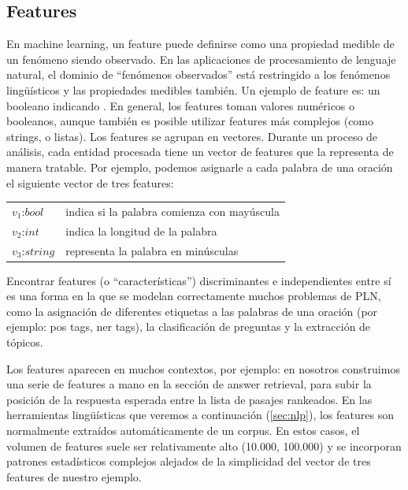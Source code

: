 \subsection*{Features}
\label{subsec:features}

En machine learning, un feature puede definirse como una propiedad medible de un fenómeno siendo observado. En las aplicaciones de procesamiento de lenguaje natural, el dominio de “fenómenos observados” está restringido a los fenómenos lingüísticos y las propiedades medibles también. Un ejemplo de feature es: un booleano indicando . En general, los features toman valores numéricos o booleanos, aunque también es posible utilizar features más complejos (como strings, o listas). Los features se agrupan en vectores. Durante un proceso de análisis, cada entidad procesada tiene un vector de features que la representa de manera tratable. Por ejemplo, podemos asignarle a cada palabra de una oración el siguiente vector de tres features:

\begin{center}
\begin{tabular}{ll}
$v_1$:$bool$ & indica si la palabra comienza con mayúscula \\
$v_2$:$int$ & indica la longitud de la palabra \\
$v_3$:$string$ & representa la palabra en minúsculas \\
\end{tabular}
\end{center}


Encontrar features (o “características”) discriminantes e independientes entre sí es una forma en la que se modelan correctamente muchos problemas de PLN, como la asignación de diferentes etiquetas a las palabras de una oración (por ejemplo: pos tags, ner tags), la clasificación de preguntas y la extracción de tópicos.

Los features aparecen en muchos contextos, por ejemplo: en  nosotros construimos una serie de features a mano en la sección de answer retrieval, para subir la posición de la respuesta esperada entre la lista de pasajes rankeados. En las herramientas lingüísticas que veremos a continuación (\ref{sec:nlp}), los features son normalmente extraídos automáticamente de un corpus. En estos casos, el volumen de features suele ser relativamente alto (10.000, 100.000) y se incorporan patrones estadísticos complejos alejados de la simplicidad del vector de tres features de nuestro ejemplo.

